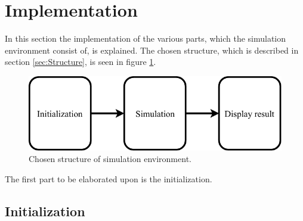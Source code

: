 \section{Implementation}\label{sec:implementation}

In this section the implementation of the various parts, which the simulation environment consist of, is explained. The chosen structure, which is described in section \ref{sec:Structure}, is seen in figure \ref{fig:Basic_implementation}. 

\begin{figure}[H]
\centering
\includegraphics[width=0.75 \textwidth]{report/simulation/pictures/Basic_implementation.pdf}
\caption{Chosen structure of simulation environment.}
\label{fig:Basic_implementation}
\end{figure}

The first part to be elaborated upon is the initialization.

 \subsection*{Initialization}


